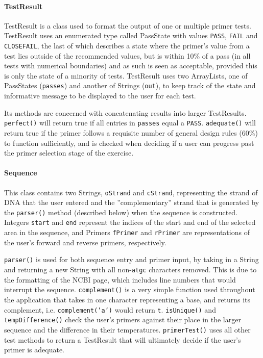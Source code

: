 \paragraph{TestResult}
TestResult is a class used to format the output of one or multiple primer 
tests. TestResult uses an enumerated type called PassState with values
\texttt{PASS}, \texttt{FAIL} and \texttt{CLOSEFAIL}, the last of which describes 
a state where the primer's value from a test lies outside of the recommended
values, but is within 10\% of a pass (in all tests with numerical boundaries) 
and as such is seen as acceptable, provided this is 
only the state of a minority of tests. TestResult uses two ArrayLists, one of
PassStates (\texttt{passes}) and another of Strings (\texttt{out}), to keep track 
of the state and informative message to be displayed to the user for each 
test. 

Its methods are concerned with concatenating results into larger 
TestResults. \texttt{perfect()} will return true if all entries in 
\texttt{passes} equal a \texttt{PASS}. \texttt{adequate()} will return true if the
primer follows a requisite number of general design rules (60\%) to function 
sufficiently, and is checked when deciding if a user can progress past the
primer selection stage of the exercise.
 
\paragraph{Sequence}
This class contains two Strings, \texttt{oStrand} and \texttt{cStrand}, 
representing the strand of DNA that the user entered and the ''complementary''
strand that is generated by the \texttt{parser()} method (described below)
when the sequence is constructed. Integers \texttt{start} and \texttt{end} represent 
the indices of the start and end of the selected area in the sequence, and Primers 
\texttt{fPrimer} and \texttt{rPrimer} are representations of the user's forward
and reverse primers, respectively.
 
\texttt{parser()} is used for both sequence entry and primer input, by taking in
a String and returning a new String with all non-\texttt{atgc} characters removed.
This is due to the formatting of the NCBI page, which includes line numbers that
would interrupt the sequence.
\texttt{complement()} is a very simple function used throughout the application
that takes in one character representing a base, and returns its complement, i.e.
\texttt{complement('a')} would return \texttt{t}. \texttt{isUnique()} and \texttt{
tempDifference()} check the user's primers against their place in the larger sequence
and the difference in their temperatures. \texttt{primerTest()} uses all other test 
methods to return a TestResult that will ultimately decide if the user's primer is
adequate.  																										%
